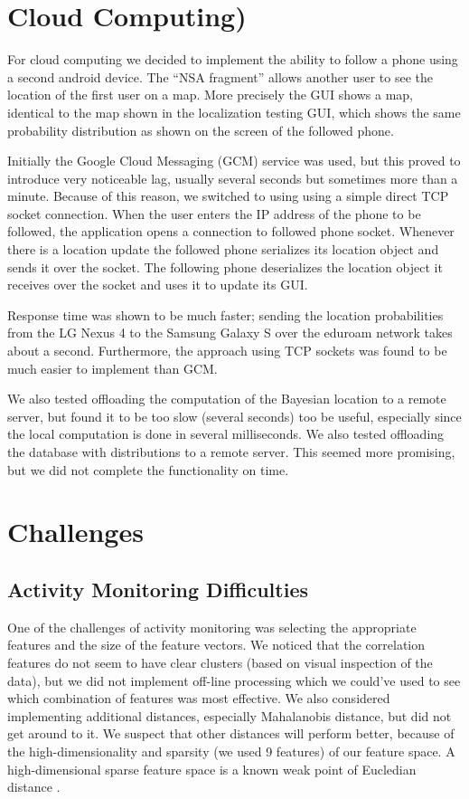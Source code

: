 \documentclass[a4paper,10pt,twoside]{IEEEtran}
\begin{document}
\section{Cloud Computing)}
\label{sec:cloud-computing}

For cloud computing we decided to implement the ability to follow a phone using a second android device.
The ``NSA fragment'' allows another user to see the location of the first user on a map. More precisely the GUI shows a map, identical to the map shown in the localization testing GUI, which shows the same probability distribution as shown on the screen of the followed phone.

Initially the Google Cloud Messaging (GCM) service was used, but this proved to introduce very noticeable lag, usually several seconds but sometimes more than a minute.
Because of this reason, we switched to using using a simple direct TCP socket connection.
When the user enters the IP address of the phone to be followed, the application opens a connection to followed phone socket.
Whenever there is a location update the followed phone serializes its location object and sends it over the socket.
The following phone deserializes the location object it receives over the socket and uses it to update its GUI.

Response time was shown to be much faster; sending the location probabilities from the LG Nexus 4 to the Samsung Galaxy S over the eduroam network takes about a second. Furthermore, the approach using TCP sockets was found to be much easier to implement than GCM.

We also tested offloading the computation of the Bayesian location to a remote server, but found it to be too slow (several seconds) too be useful, especially since the local computation is done in several milliseconds.
We also tested offloading the database with distributions to a remote server.
This seemed more promising, but we did not complete the functionality on time.

\section{Challenges}
\label{sec:innovation}
\subsection{Activity Monitoring Difficulties}
One of the challenges of activity monitoring was selecting the appropriate features and the size of the feature vectors.
We noticed that the correlation features do not seem to have clear clusters (based on visual inspection of the data), but we did not implement off-line processing which we could've used to see which combination of features was most effective.
We also considered implementing additional distances, especially Mahalanobis distance, but did not get around to it. 
We suspect that other distances will perform better, because of the high-dimensionality and sparsity (we used 9 features) of our feature space.
A high-dimensional sparse feature space is a known weak point of Eucledian distance \cite{wikipedia1}.
\end{document}
